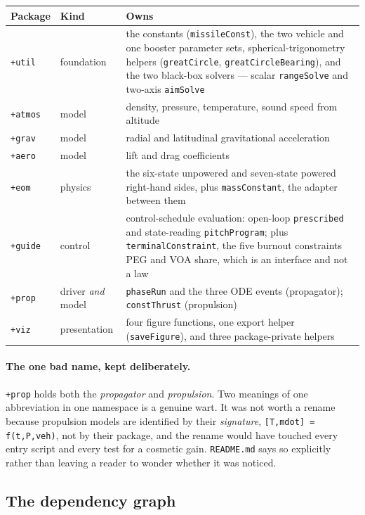 \documentclass[11pt]{article}
\newcommand{\code}[1]{\texttt{#1}}
\newcommand{\pkg}[1]{\texttt{+#1}}
\begin{document}
\begin{center}
\begin{tabular}{llp{7.2cm}}
\toprule
Package & Kind & Owns \\
\midrule
\pkg{util}  & foundation   & the constants (\code{missileConst}), the two vehicle and one booster parameter sets, spherical-trigonometry helpers (\code{greatCircle}, \code{greatCircleBearing}), and the two black-box solvers --- scalar \code{rangeSolve} and two-axis \code{aimSolve} \\
\pkg{atmos} & model        & density, pressure, temperature, sound speed from altitude \\
\pkg{grav}  & model        & radial and latitudinal gravitational acceleration \\
\pkg{aero}  & model        & lift and drag coefficients \\
\pkg{eom}   & physics      & the six-state unpowered and seven-state powered right-hand sides, plus \code{massConstant}, the adapter between them \\
\pkg{guide} & control      & control-schedule evaluation: open-loop \code{prescribed} and state-reading \code{pitchProgram}; plus \code{terminalConstraint}, the five burnout constraints PEG and VOA share, which is an interface and not a law \\
\pkg{prop}  & driver \emph{and} model & \code{phaseRun} and the three ODE events (propagator); \code{constThrust} (propulsion) \\
\pkg{viz}   & presentation & four figure functions, one export helper (\code{saveFigure}), and three package-private helpers \\
\bottomrule
\end{tabular}
\end{center}

\paragraph{The one bad name, kept deliberately.} \pkg{prop} holds both the
\emph{propagator} and \emph{propulsion}. Two meanings of one abbreviation in
one namespace is a genuine wart. It was not worth a rename because propulsion
models are identified by their \emph{signature},
\code{[T,mdot] = f(t,P,veh)}, not by their package, and the rename would have
touched every entry script and every test for a cosmetic gain.
\code{README.md} says so explicitly rather than leaving a reader to wonder
whether it was noticed.

\subsection{The dependency graph}
\end{document}
